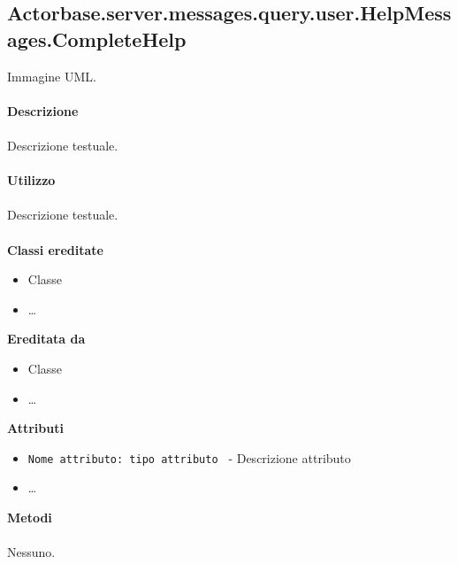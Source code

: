 \documentclass[a4paper]{article}
\begin{document}
	\subsection{Actorbase.server.messages.query.user.HelpMessages.CompleteHelp}
		Immagine UML.
		\\ \\
		\textbf{Descrizione}
			\\ \\
			Descrizione testuale.
			\\ \\
		\textbf{Utilizzo}
			\\ \\
			Descrizione testuale.
			\\ \\
		\textbf{Classi ereditate}
			\begin{itemize}
				\item Classe
				\item \dots
			\end{itemize}
		\textbf{Ereditata da}
			\begin{itemize}
				\item Classe
				\item \dots
			\end{itemize}
		\textbf{Attributi}
			\begin{itemize}
				\item \texttt{Nome attributo: tipo attributo } - Descrizione attributo
				\item \dots
			\end{itemize}
		\textbf{Metodi}
			\\ \\
			Nessuno.	
			
\end{document}

